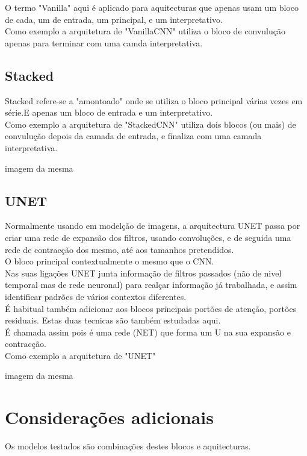 O termo "Vanilla" aqui é aplicado para aquitecturas que apenas usam um bloco de cada, um de entrada, um principal, e um interpretativo. \\
Como exemplo a arquitetura de "VanillaCNN" utiliza o bloco de convulução apenas para terminar com uma camda interpretativa.


\subsection{Stacked\label{se:stacked}}

Stacked refere-se a "amontoado" onde se utiliza o bloco principal várias vezes em série.E apenas um bloco de  entrada e um interpretativo. \\
Como exemplo a arquitetura de "StackedCNN" utiliza dois blocos (ou mais) de convulução depois da camada de entrada, e finaliza com uma camada interpretativa.

imagem da mesma



\subsection{UNET\label{se:UNET}}

Normalmente usando em modelção de imagens, a arquitectura UNET passa por criar uma rede de expansão dos filtros, usando convoluções, e de seguida uma rede de contracção dos mesmo, até aos tamanhos pretendidos.\\
O bloco principal contextualmente o mesmo que o CNN.\\
Nas suas ligações UNET junta informação de filtros passados (não de nivel temporal mas de rede neuronal) para realçar informação já trabalhada, e assim identificar padrões de vários contextos diferentes.\\
É habitual também adicionar aos blocos principais portões de atenção, portões residuais. Estas duas tecnicas são também estudadas aqui.\\
É chamada assim pois é uma rede (NET) que forma um U na sua expansão e contracção.\\

Como exemplo a arquitetura de "UNET"

imagem da mesma


\section{Considerações adicionais\label{se:modelos_plus}}

Os modelos testados são combinações destes blocos e aquitecturas. 


